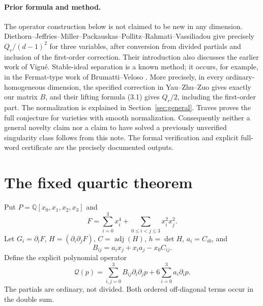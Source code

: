 \documentclass[11pt,letterpaper]{article}
\theoremstyle{remark}\newtheorem{remark}[theorem]{Remark}
\DeclareMathOperator{\adj}{adj}
\newcommand{\QQ}{\mathbb Q}
\begin{document}
\paragraph{Prior formula and method.}
The operator construction below is not claimed to be new in any dimension.
Diethorn--Jeffries--Miller--Packauskas--Pollitz--Rahmati--Vassiliadou
\cite[Sections 4.1.3 and 4.5, equations (33), (35), Theorem 4.5.1]{DJM}
give precisely \(Q_r/(d-1)^2\) for three variables, after conversion from divided
partials and inclusion of the first-order correction. Their introduction
also discusses the earlier work of Vigu\'e. Stable-ideal separation is a
known method; it occurs, for example, in the Fermat-type work of
Brumatti--Veloso \cite{BV}. More precisely, in every ordinary-homogeneous
dimension, the specified correction in Yau--Zhu--Zuo
\cite[equations (3.3), (5.1), (5.6), Corollary 5.5]{YZZ} gives exactly our
matrix $B$, and their lifting formula (3.1) gives $Q_r/2$, including the
first-order part. The normalization is explained in
Section~\ref{sec:general}. Traves \cite{Traves} proves the full conjecture for varieties
with smooth normalization. Consequently neither a general novelty claim nor
a claim to have solved a previously unverified singularity class follows from
this note. The formal verification and explicit full-word certificate are the
precisely documented outputs.

\section{The fixed quartic theorem}
Put \(P=\QQ[x_0,x_1,x_2,x_3]\) and
\begin{equation}\label{eq:F}
 F=\sum_{i=0}^3x_i^4+\sum_{0\le i<j\le3}x_i^2x_j^2.
\end{equation}
Let \(G_i=\partial_iF\), \(H=(\partial_i\partial_jF)\),
\(C=\adj(H)\), \(h=\det H\), \(a_i=C_{i0}\), and
\[
 B_{ij}=a_ix_j+x_ia_j-x_0C_{ij}.
\]
Define the explicit polynomial operator
\begin{equation}\label{eq:QP}
 \mathcal Q(p)=\sum_{i,j=0}^3B_{ij}\partial_i\partial_jp
              +6\sum_{i=0}^3a_i\partial_ip.
\end{equation}
The partials are ordinary, not divided. Both ordered off-diagonal terms
occur in the double sum.
\end{document}
